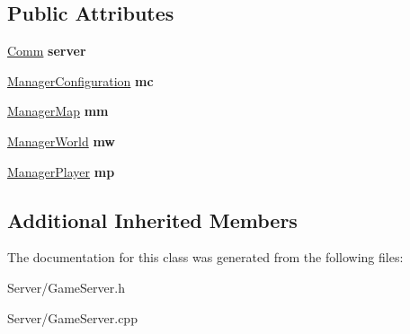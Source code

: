 \subsection*{Public Attributes}
\begin{DoxyCompactItemize}
\item 
\hypertarget{classbali_1_1_game_server_abe1dfe59ba925ff2fdd0cf5576776c63}{\hyperlink{classbali_1_1_comm}{Comm} {\bfseries server}}\label{classbali_1_1_game_server_abe1dfe59ba925ff2fdd0cf5576776c63}

\item 
\hypertarget{classbali_1_1_game_server_a089cbc2dccc28aeb2ed886de25041204}{\hyperlink{classbali_1_1_manager_configuration}{Manager\-Configuration} {\bfseries mc}}\label{classbali_1_1_game_server_a089cbc2dccc28aeb2ed886de25041204}

\item 
\hypertarget{classbali_1_1_game_server_a5a236d8003a011ada4ce9a129feb4ac3}{\hyperlink{classbali_1_1_manager_map}{Manager\-Map} {\bfseries mm}}\label{classbali_1_1_game_server_a5a236d8003a011ada4ce9a129feb4ac3}

\item 
\hypertarget{classbali_1_1_game_server_a04ae8c06216154da3e522c61e13de65e}{\hyperlink{classbali_1_1_manager_world}{Manager\-World} {\bfseries mw}}\label{classbali_1_1_game_server_a04ae8c06216154da3e522c61e13de65e}

\item 
\hypertarget{classbali_1_1_game_server_a3fc5a594a4dbe8a45ee04e7ff64334c0}{\hyperlink{classbali_1_1_manager_player}{Manager\-Player} {\bfseries mp}}\label{classbali_1_1_game_server_a3fc5a594a4dbe8a45ee04e7ff64334c0}

\end{DoxyCompactItemize}
\subsection*{Additional Inherited Members}


The documentation for this class was generated from the following files\-:\begin{DoxyCompactItemize}
\item 
Server/Game\-Server.\-h\item 
Server/Game\-Server.\-cpp\end{DoxyCompactItemize}
